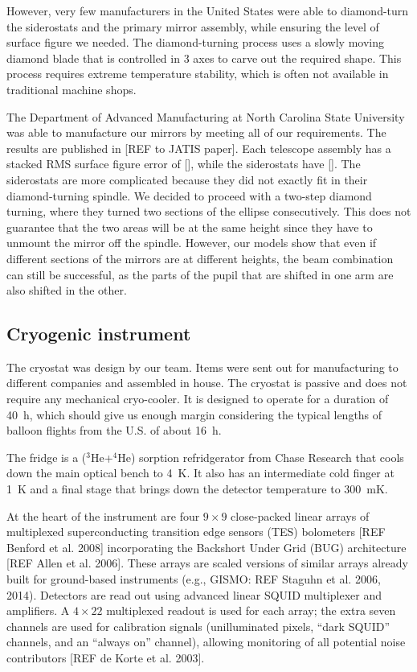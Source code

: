 However, very few manufacturers in the United States were able to diamond-turn the siderostats and the primary mirror assembly, while ensuring the level of surface figure we needed. The diamond-turning process uses a slowly moving diamond blade that is controlled in 3 axes to carve out the required shape. This process requires extreme temperature stability, which is often not available in traditional machine shops. 

The Department of Advanced Manufacturing at North Carolina State University was able to manufacture our mirrors by meeting all of our requirements. The results are published in [REF to JATIS paper]. Each telescope assembly has a stacked RMS surface figure error of [], while the siderostats have []. The siderostats are more complicated because they did not exactly fit in their diamond-turning spindle. We decided to proceed with a two-step diamond turning, where they turned two sections of the ellipse consecutively. This does not guarantee that the two areas will be at the same height since they have to unmount the mirror off the spindle. However, our models show that even if different sections of the mirrors are at different heights, the beam combination can still be successful, as the parts of the pupil that are shifted in one arm are also shifted in the other. 




\subsection{Cryogenic instrument}

The cryostat was design by our team. Items were sent out for manufacturing to different companies and assembled in house. The cryostat is passive and does not require any mechanical cryo-cooler. It is designed to operate for a duration of \SI{40}{\hour}, which should give us enough margin considering the typical lengths of balloon flights from the U.S. of about \SI{16}{\hour}. 

The fridge is a ($^3$He+$^4$He) sorption refridgerator from Chase Research that cools down the main optical bench to \SI{4}{\kelvin}. It also has an intermediate cold finger at \SI{1}{\kelvin} and a final stage that brings down the detector temperature to \SI{300}{\milli\kelvin}. 

At the heart of the instrument are four $9\times 9$ close-packed linear arrays of multiplexed superconducting transition edge sensors (TES) bolometers [REF Benford et al. 2008] incorporating the Backshort Under Grid (BUG) architecture [REF Allen et al. 2006]. These arrays are scaled versions of similar arrays already built for ground-based instruments (e.g., GISMO: REF Staguhn et al. 2006, 2014). Detectors are read out using advanced linear SQUID multiplexer and amplifiers. A $4\times 22$ multiplexed readout is used for each array; the extra seven channels are used for calibration signals (unilluminated pixels, “dark SQUID” channels, and an “always on” channel), allowing monitoring of all potential noise contributors [REF de Korte et al. 2003].  


